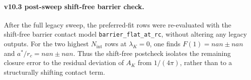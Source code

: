 \paragraph{v10.3 post-sweep shift-free barrier check.}
After the full legacy sweep, the preferred-fit rows were re-evaluated with the shift-free barrier contact model \texttt{barrier\_flat\_at\_rc}, without altering any legacy outputs. For the two highest $N_{\mathrm{int}}$ rows at $\lambda_K=0$, one finds $F(1) = nan \pm nan$ and $a^*/r_c = nan \pm nan$. Thus the shift-free postcheck isolates the remaining closure error to the residual deviation of $A_K$ from $1/(4\pi)$, rather than to a structurally shifting contact term.
